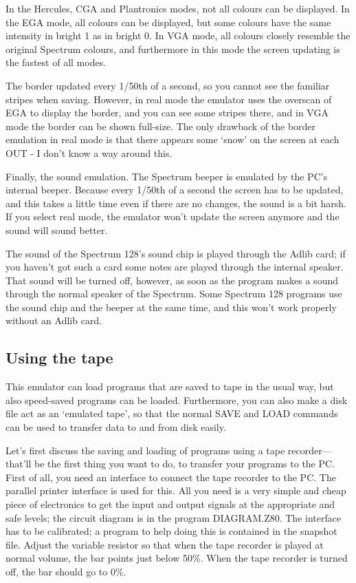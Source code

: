     In the Hercules, CGA and Plantronics modes, not all colours can be
    displayed.  In the EGA mode, all colours can be displayed, but some
    colours have the same intensity in bright 1 as in bright 0.  In VGA
    mode, all colours closely resemble the original Spectrum colours, and
    furthermore in this mode the screen updating is the fastest of all
    modes.

    The border updated every 1/50th of a second, so you cannot see the
    familiar stripes when saving.  However, in real mode the emulator uses
    the overscan of EGA to display the border, and you can see some stripes
    there, and in VGA mode the border can be shown full-size.  The only
    drawback of the border emulation in real mode is that there appears some
    `snow' on the screen at each OUT - I don't know a way around this.


    Finally, the sound emulation.  The Spectrum beeper is emulated by the
    PC's internal beeper.  Because every 1/50th of a second the screen has
    to be updated, and this takes a little time even if there are no
    changes, the sound is a bit harsh.  If you select real mode, the
    emulator won't update the screen anymore and the sound will sound
    better.

    The sound of the Spectrum 128's sound chip is played through the Adlib
    card; if you haven't got such a card some notes are played through the
    internal speaker.  That sound will be turned off, however, as soon as
    the program makes a sound through the normal speaker of the Spectrum.
    Some Spectrum 128 programs use the sound chip and the beeper at the same
    time, and this won't work properly without an Adlib card.



\subsection{Using the tape}

    This emulator can load programs that are saved to tape in the usual way,
    but also speed-saved programs can be loaded.  Furthermore, you can also
    make a disk file act as an `emulated tape', so that the normal SAVE and
    LOAD commands can be used to transfer data to and from disk easily.

    Let's first discuss the saving and loading of programs using a tape
    recorder---that'll be the first thing you want to do, to transfer your
    programs to the PC\@.  First of all, you need an interface to connect the
    tape recorder to the PC\@.  The parallel printer interface is used for
    this.  All you need is a very simple and cheap piece of electronics to
    get the input and output signals at the appropriate and safe levels; the
    circuit diagram is in the program DIAGRAM.Z80.  The interface has to be
    calibrated; a program to help doing this is contained in the snapshot
    file.  Adjust the variable resistor so that when the tape recorder is
    played at normal volume, the bar points just below 50\%. When the tape
    recorder is turned off, the bar should go to 0\%.

